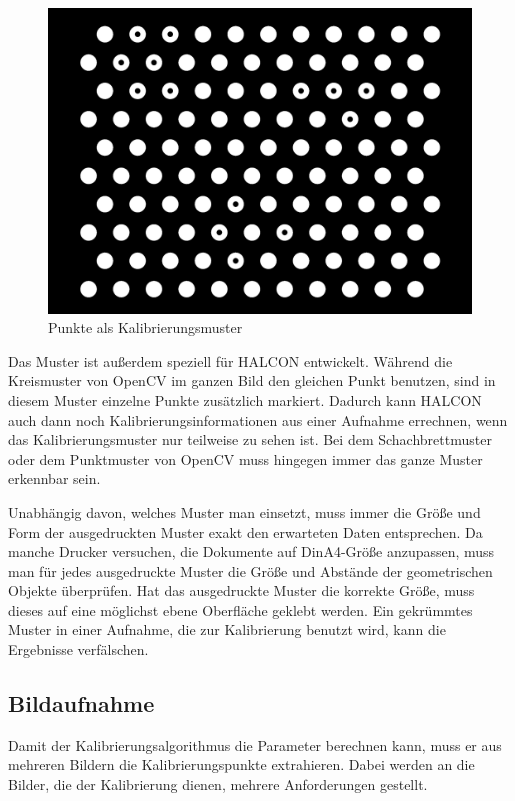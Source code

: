 \begin{figure}[!hbt]
\centering
	\vspace{1ex}
	\includegraphics[scale=0.2]{../images/caltab_hex_10x11}
	\caption[Punkte als Kalibrierungsmuster]{\label{img:caltab_hex_10x11} Punkte als Kalibrierungsmuster}
	\vspace{1ex}
\end{figure}

Das Muster ist außerdem speziell für HALCON entwickelt. Während die Kreismuster von OpenCV im ganzen Bild den gleichen Punkt benutzen, sind in diesem Muster einzelne Punkte zusätzlich markiert. Dadurch kann HALCON auch dann noch Kalibrierungsinformationen aus einer Aufnahme errechnen, wenn das Kalibrierungsmuster nur teilweise zu sehen ist. Bei dem Schachbrettmuster oder dem Punktmuster von OpenCV muss hingegen immer das ganze Muster erkennbar sein.

Unabhängig davon, welches Muster man einsetzt, muss immer die Größe und Form der ausgedruckten Muster exakt den erwarteten Daten entsprechen. Da manche Drucker versuchen, die Dokumente auf DinA4-Größe anzupassen, muss man für jedes ausgedruckte Muster die Größe und Abstände der geometrischen Objekte überprüfen. Hat das ausgedruckte Muster die korrekte Größe, muss dieses auf eine möglichst ebene Oberfläche geklebt werden. Ein gekrümmtes Muster in einer Aufnahme, die zur Kalibrierung benutzt wird, kann die Ergebnisse verfälschen. 

\subsection{Bildaufnahme} %
\label{sub:bildaufnahme}
Damit der Kalibrierungsalgorithmus die Parameter berechnen kann, muss er aus mehreren Bildern die Kalibrierungspunkte extrahieren. Dabei werden an die Bilder, die der Kalibrierung dienen, mehrere Anforderungen gestellt. 

